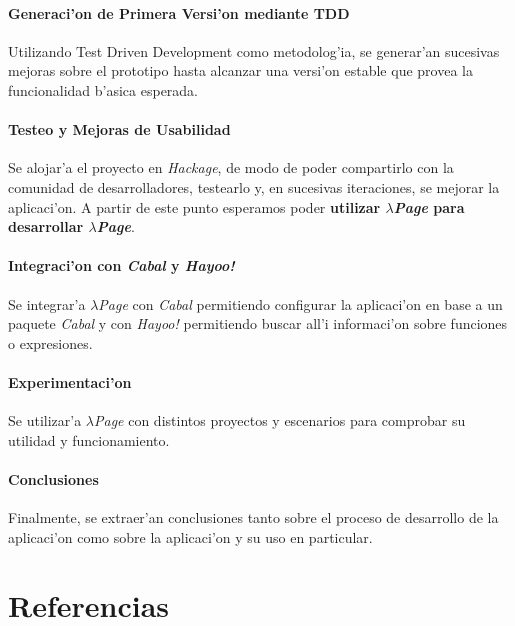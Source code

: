 \documentclass[a4paper]{article}
\begin{document}
\paragraph{Generaci'on de Primera Versi'on mediante TDD} Utilizando Test Driven Development como metodolog'ia, se generar'an sucesivas mejoras sobre el prototipo hasta alcanzar una versi'on estable que provea la funcionalidad b'asica esperada.
\paragraph{Testeo y Mejoras de Usabilidad} Se alojar'a el proyecto en \textsl{Hackage}, de modo de poder compartirlo con la comunidad de desarrolladores, testearlo y, en sucesivas iteraciones, se mejorar la aplicaci'on.  A partir de este punto esperamos poder \textbf{utilizar \textsl{$\lambda$Page} para desarrollar \textsl{$\lambda$Page}}.
\paragraph{Integraci'on con \textsl{Cabal} y \textsl{Hayoo!}} Se integrar'a \textsl{$\lambda$Page} con \textsl{Cabal} permitiendo configurar la aplicaci'on en base a un paquete \textsl{Cabal} y con \textsl{Hayoo!} permitiendo buscar all'i informaci'on sobre funciones o expresiones.
\paragraph{Experimentaci'on} Se utilizar'a \textsl{$\lambda$Page} con distintos proyectos y escenarios para comprobar su utilidad y funcionamiento.
\paragraph{Conclusiones} Finalmente, se extraer'an conclusiones tanto sobre el proceso de desarrollo de la aplicaci'on como sobre la aplicaci'on y su uso en particular.

\appendix
\section{Referencias}
\paragraph{}
\end{document}
